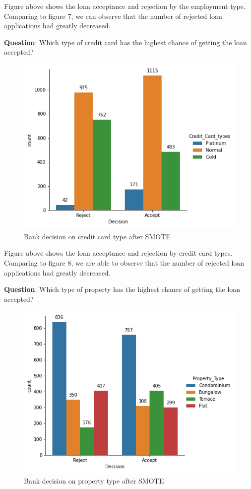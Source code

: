 \documentclass[11pt]{article}
\begin{document}
Figure above shows the loan acceptance and rejection by the employment type. Comparing to figure 7, we can observe that the number of rejected loan applications had greatly decreased.
\clearpage

\noindent \textbf{Question}: Which type of credit card has the highest chance of getting the loan accepted?
\begin{figure}[h]
\centerline{\includegraphics[scale=0.8]{aSMOTE_dcs_ccard_type.png} }
\label{fig:aSmoteDSCcc}
\caption{Bank decision on credit card type after SMOTE}
\end{figure}

Figure above shows the loan acceptance and rejection by credit card types. Comparing to figure 8, we are able to observe that the number of rejected loan applications had greatly decreased.
\clearpage

\noindent \textbf{Question}: Which type of property has the highest chance of getting the loan accepted?
\begin{figure}[h]
\centerline{\includegraphics[scale=0.8]{aSMOTE_dcs_property.png} }
\label{fig:aSmoteDCSproperty}
\caption{Bank decision on property type after SMOTE}
\end{figure}
\end{document}
